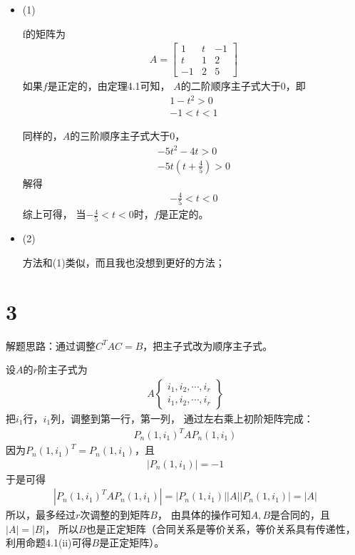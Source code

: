 \documentclass{article}
\begin{document}
\begin{itemize}
  \item (1)

        f的矩阵为
        \begin{align*}
          A = \begin{bmatrix}
                1  & t & -1 \\
                t  & 1 & 2  \\
                -1 & 2 & 5
              \end{bmatrix}
        \end{align*}
        如果$f$是正定的，由定理4.1可知，
        $A$的二阶顺序主子式大于$0$，即
        \begin{align*}
          1 - t^2 > 0 \\
          -1 < t < 1
        \end{align*}

        同样的，$A$的三阶顺序主子式大于$0$，
        \begin{align*}
          -5 t^2 - 4t > 0 \\
          -5t (t + \frac{4}{5}) > 0
        \end{align*}
        解得
        \begin{align*}
          - \frac{4}{5} < t < 0
        \end{align*}
        综上可得，
        当$- \frac{4}{5} < t < 0$时，$f$是正定的。

  \item (2)

        方法和(1)类似，而且我也没想到更好的方法；

\end{itemize}

\section*{3}

解题思路：通过调整$C^T A C = B$，把主子式改为顺序主子式。

设$A$的$r$阶主子式为
\begin{align*}
  A
  \begin{Bmatrix}
    i_1, i_2, \cdots, i_r \\
    i_1, i_2, \cdots, i_r
  \end{Bmatrix}
\end{align*}
把$i_1$行，$i_1$列，调整到第一行，第一列，
通过左右乘上初阶矩阵完成：
\begin{align*}
  P_n(1, i_1)^T A P_n(1, i_1)
\end{align*}
因为$P_n(1, i_1)^T = P_n(1, i_1)$，且
\begin{align*}
  |P_n(1, i_1)| = - 1
\end{align*}
于是可得
\begin{align*}
  |P_n(1, i_1)^T A P_n(1, i_1)| = |P_n(1, i_1)| |A| |P_n(1, i_1)| = |A|
\end{align*}
所以，最多经过$r$次调整的到矩阵$B$，
由具体的操作可知$A, B$是合同的，且$|A| = |B|$，
所以$B$也是正定矩阵（合同关系是等价关系，等价关系具有传递性，利用命题4.1(ii)可得$B$是正定矩阵）。
\end{document}
